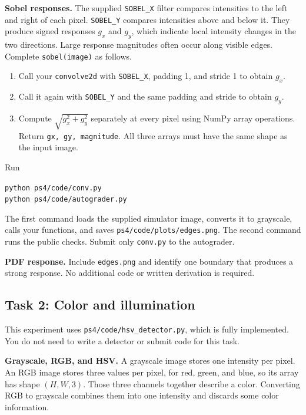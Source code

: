 \documentclass[11pt]{article}
\newenvironment{studentanswer}[1]
  {\par\medskip\noindent
   \begin{tcolorbox}[height from=#1 to 100cm, colback=white, colframe=gray!60,
     boxrule=0.6pt, arc=0pt, outer arc=0pt, left=7pt, right=7pt,
     top=7pt, bottom=7pt, title={Answer / work}, fonttitle=\small,
     coltitle=black, colbacktitle=gray!8, titlerule=0pt]
   \ignorespaces}
  {\end{tcolorbox}\par}
\begin{document}
\textbf{Sobel responses.} The supplied \texttt{SOBEL\_X} filter compares
intensities to the left and right of each pixel. \texttt{SOBEL\_Y}
compares intensities above and below it. They produce signed responses
$g_x$ and $g_y$, which indicate local intensity changes in the two
directions. Large response magnitudes often occur along visible edges.
Complete \texttt{sobel(image)} as follows.
\begin{enumerate}
\item Call your \texttt{convolve2d} with \texttt{SOBEL\_X},
padding 1, and stride 1 to obtain $g_x$.
\item Call it again with \texttt{SOBEL\_Y} and the same padding and stride
to obtain $g_y$.
\item Compute $\sqrt{g_x^2+g_y^2}$ separately at every pixel using
NumPy array operations. Return \texttt{gx, gy, magnitude}.
All three arrays must have the same shape as the input image.
\end{enumerate}
Run
\begin{center}
\texttt{python ps4/code/conv.py}\\
\texttt{python ps4/code/autograder.py}
\end{center}
The first command loads the supplied simulator image, converts it to
grayscale, calls your functions, and saves
\texttt{ps4/code/plots/edges.png}. The second command runs the public
checks. Submit only \texttt{conv.py} to the autograder.

\textbf{PDF response.} Include \texttt{edges.png} and identify one boundary
that produces a strong response. No additional code or written derivation
is required.

\begin{studentanswer}{8cm}
\end{studentanswer}

\clearpage
\subsection{Task 2: Color and illumination}
This experiment uses \texttt{ps4/code/hsv\_detector.py}, which is fully
implemented. You do not need to write a detector or submit code for this task.

\textbf{Grayscale, RGB, and HSV.} A grayscale image stores one intensity
per pixel. An RGB image stores three values per pixel, for red, green,
and blue, so its array has shape $(H,W,3)$. Those three channels together
describe a color. Converting RGB to grayscale combines them into one
intensity and discards some color information.
\end{document}
